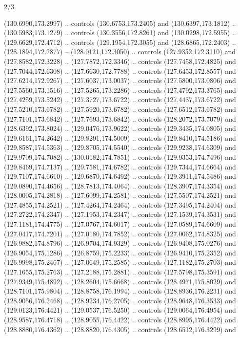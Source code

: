 \begin{flagdescription}{2/3}
\begin{scope}[shift={(0.5\flaglength,0.5)},scale=\flagwidth/320]
\begin{scope}[y=0.8pt, x=0.8pt, yscale=-1,shift={(-118.3,-146)}]
  (130.6990,173.2997) .. controls (130.6753,173.2405) and (130.6397,173.1812) ..
  (130.5983,173.1279) .. controls (130.3556,172.8261) and (130.0298,172.5955) ..
  (129.6629,172.4712) .. controls (129.1954,172.3055) and (128.6865,172.2403) ..
  (128.1894,172.2877) -- (128.0121,172.3050) .. controls (127.9352,172.3110) and
  (127.8582,172.3228) .. (127.7872,172.3346) .. controls (127.7458,172.4825) and
  (127.7044,172.6308) .. (127.6630,172.7788) .. controls (127.6453,172.8557) and
  (127.6214,172.9267) .. (127.6037,173.0037) .. controls (127.5800,173.0806) and
  (127.5560,173.1516) .. (127.5265,173.2286) .. controls (127.4792,173.3765) and
  (127.4259,173.5242) .. (127.3727,173.6722) .. controls (127.4437,173.6722) and
  (127.5210,173.6782) .. (127.5920,173.6782) .. controls (127.6512,173.6782) and
  (127.7101,173.6842) .. (127.7693,173.6842) .. controls (128.2072,173.7079) and
  (128.6392,173.8024) .. (129.0476,173.9622) .. controls (129.3435,174.0805) and
  (129.6161,174.2642) .. (129.8291,174.5009) .. controls (129.8410,174.5186) and
  (129.8587,174.5363) .. (129.8705,174.5540) .. controls (129.9238,174.6309) and
  (129.9709,174.7082) .. (130.0182,174.7851) .. controls (129.9353,174.7496) and
  (129.8469,174.7137) .. (129.7581,174.6782) .. controls (129.7344,174.6664) and
  (129.7107,174.6610) .. (129.6870,174.6492) .. controls (129.3911,174.5486) and
  (129.0890,174.4656) .. (128.7813,174.4064) .. controls (128.3907,174.3354) and
  (128.0005,174.2818) .. (127.6099,174.2581) .. controls (127.5507,174.2521) and
  (127.4855,174.2521) .. (127.4264,174.2464) .. controls (127.3495,174.2404) and
  (127.2722,174.2347) .. (127.1953,174.2347) .. controls (127.1539,174.3531) and
  (127.1181,174.4775) .. (127.0767,174.6017) .. controls (127.0589,174.6609) and
  (127.0417,174.7201) .. (127.0180,174.7852) .. controls (127.0062,174.8325) and
  (126.9882,174.8796) .. (126.9704,174.9329) .. controls (126.9408,175.0276) and
  (126.9054,175.1286) .. (126.8759,175.2233) .. controls (126.9410,175.2352) and
  (126.9998,175.2467) .. (127.0649,175.2585) .. controls (127.1182,175.2703) and
  (127.1655,175.2763) .. (127.2188,175.2881) .. controls (127.5798,175.3591) and
  (127.9349,175.4892) .. (128.2604,175.6668) .. controls (128.4971,175.8029) and
  (128.7101,175.9804) .. (128.8758,176.1994) .. controls (128.8936,176.2231) and
  (128.9056,176.2468) .. (128.9234,176.2705) .. controls (128.9648,176.3533) and
  (129.0123,176.4421) .. (129.0537,176.5250) .. controls (129.0064,176.4954) and
  (128.9587,176.4718) .. (128.9055,176.4422) .. controls (128.8995,176.4422) and
  (128.8880,176.4362) .. (128.8820,176.4305) .. controls (128.6512,176.3299) and

\end{scope}
\end{scope}
\end{flagdescription}
